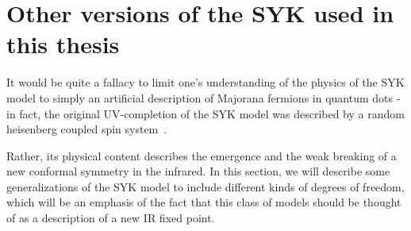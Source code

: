 \section{Other versions of the SYK used in this thesis}
It would be quite a fallacy to limit one's understanding of the physics of the SYK model to simply an artificial description of Majorana fermions in quantum dots - in fact, the original UV-completion of the SYK model was described by a random heisenberg coupled spin system~\cite{sachdev1993gapless}.
\par
Rather, its physical content  describes the emergence and the weak breaking of a new conformal symmetry in the infrared. In this section, we will describe some generalizations of the SYK model to include different kinds of degrees of freedom, which will be an emphasis of the fact that this class of models should be thought of as a description of a new IR fixed point. 

